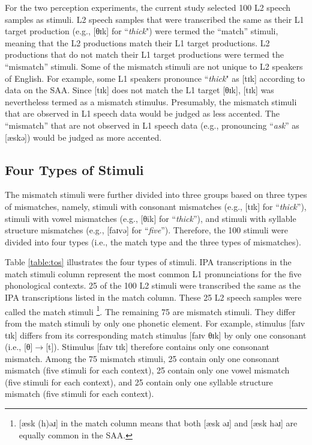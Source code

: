 For the two perception experiments, the current study selected 100 L2 speech samples as stimuli. L2 speech samples that were transcribed the same as their L1 target production (e.g., [θɪk] for ``\textit{thick}") were termed the “match” stimuli, meaning that the L2 productions match their L1 target productions. L2 productions that do not match their L1 target productions were termed the “mismatch” stimuli.  Some of the mismatch stimuli are not unique to L2 speakers of English. For example, some L1 speakers pronounce ``\textit{thick}" as [tɪk] according to data on the SAA. Since [tɪk] does not match the L1 target [θɪk],  [tɪk] was nevertheless termed as a mismatch stimulus. Presumably, the mismatch stimuli that are observed in L1 speech data would be judged as less accented. The “mismatch” that are not observed in L1 speech data (e.g., pronouncing “\textit{ask}” as [æskə]) would be judged as more accented. 


\subsection{Four Types of Stimuli}

The mismatch stimuli were further divided into three groups based on three types of mismatches, namely, stimuli with consonant mismatches (e.g., [tɪk] for “\textit{thick}”), stimuli with vowel mismatches (e.g., [θik] for “\textit{thick}”), and stimuli with syllable structure mismatches (e.g., [faɪvə] for “\textit{five}”). Therefore, the 100 stimuli were divided into four types (i.e., the match type and the three types of mismatches). 

Table \ref{table:tos} illustrates the four types of stimuli. IPA transcriptions in the match stimuli column represent the most common L1 pronunciations for the five phonological contexts. 25 of the 100 L2 stimuli were transcribed the same as the IPA transcriptions listed in the match column. These 25 L2 speech samples were called the match stimuli \footnote{[æsk (h)əɹ] in the match column means that both [æsk əɹ] and [æsk həɹ] are equally common in the SAA.}. The remaining 75 are mismatch stimuli. They differ from the match stimuli by only one phonetic element. For example, stimulus [faɪv tɪk] differs from its corresponding match stimulus [faɪv θɪk] by only one consonant (i.e., [θ]$\rightarrow$[t]). Stimulus [faɪv tɪk] therefore contains only one consonant mismatch. Among the 75 mismatch stimuli, 25 contain only one consonant mismatch (five stimuli for each context), 25 contain only one vowel mismatch (five stimuli for each context), and 25 contain only one syllable structure mismatch (five stimuli for each context). 

